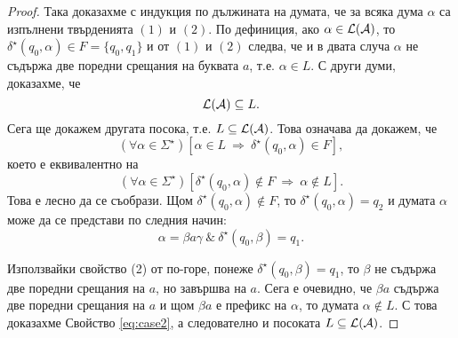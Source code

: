 \begin{proof}
 Така доказахме с индукция по дължината на думата, че за всяка дума $\alpha$ са  изпълнени твърденията $(1)$ и $(2)$.
 По дефиниция, ако $\alpha \in \mathcal{L}(\mathcal{A})$, то $\delta^\star(q_0,\alpha) \in F = \{q_0,q_1\}$ и от $(1)$ и $(2)$ следва, че и в двата случа
 $\alpha$ не съдържа две поредни срещания на буквата $a$, т.е. $\alpha \in L$.
 С други думи, доказахме, че 
 \[\mathcal{L}(\mathcal{A}) \subseteq L.\]
 Сега ще докажем другата посока, т.е. $L \subseteq \mathcal{L}(\mathcal{A})$.
 Това означава да докажем, че
 \[(\forall \alpha \in \Sigma^\star)[\alpha \in L\ \Rightarrow\ \delta^\star(q_0,\alpha) \in F],\]
 което е еквивалентно на
 \begin{equation}
   \label{eq:case2}
   (\forall \alpha \in \Sigma^\star)[\delta^\star(q_0,\alpha) \not\in F \ \Rightarrow\ \alpha\not\in L].
 \end{equation}
 Това е лесно да се съобрази.
 Щом $\delta^\star(q_0,\alpha) \not\in F$, то 
 $\delta^\star(q_0,\alpha) = q_2$ и думата $\alpha$ може да се представи по следния начин:
 \[\alpha = \beta a \gamma\ \&\ \delta^\star(q_0,\beta) = q_1.\]
 
 Използвайки свойство (2) от по-горе, понеже $\delta^\star(q_0,\beta) = q_1$, то
 $\beta$ не съдържа две поредни срещания на $a$, но завършва на $a$.
 Сега е очевидно, че $\beta a$ съдържа две поредни срещания на $a$ и 
 щом $\beta a$ е префикс на $\alpha$, то думата $\alpha \not\in L$.
 С това доказахме Свойство \ref{eq:case2}, а следователно и посоката $L\subseteq \mathcal{L}(\mathcal{A})$.
\end{proof}


